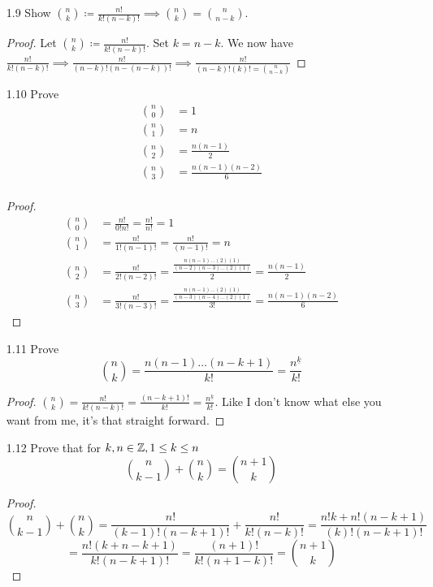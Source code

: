 \documentclass[12pt]{article}
\begin{document}
\begin{itemize}
		\item [1.9] Show $\binom{n}{k} \coloneq \frac{n!}{k!(n-k)!} \implies \binom{n}{k} = \binom{n}{n-k}$.
		\begin{proof}
			Let $\binom{n}{k} \coloneq \frac{n!}{k!(n-k)!}$. Set $k=n-k$. We now have $\frac{n!}{k!(n-k)!} \implies \frac{n!}{(n-k)!(n-(n-k))!} \implies \frac{n!}{(n-k)!(k)! = \binom{n}{n-k}}$
		\end{proof}
		\item [1.10] Prove 
			\begin{align*}
				\binom{n}{0} &= 1\\
				\binom{n}{1} &= n\\
				\binom{n}{2} &= \frac{n(n-1)}{2}\\
				\binom{n}{3} &= \frac{n(n-1)(n-2)}{6}\\
			\end{align*}
			\begin{proof}
				\begin{align*}
					\binom{n}{0} &= \frac{n!}{0!n!} = \frac{n!}{n!} = 1\\
					\binom{n}{1} &= \frac{n!}{1!(n-1)!} = \frac{n!}{(n-1)!} = n\\
					\binom{n}{2} &= \frac{n!}{2!(n-2)!} = \frac{\frac{n(n-1)\ldots(2)(1)}{(n-2)(n-3)\ldots(2)(1)}}{2} = \frac{n(n-1)}{2}\\
					\binom{n}{3} &= \frac{n!}{3!(n-3)!} = \frac{\frac{n(n-1)\ldots(2)(1)}{(n-3)(n-4)\ldots(2)(1)}}{3!} = \frac{n(n-1)(n-2)}{6}
				\end{align*}
			\end{proof}
		\item [1.11] Prove $$\binom{n}{k} = \frac{n(n-1)\ldots(n-k+1)}{k!} = \frac{n^{\underline{k}}}{k!}$$
		\begin{proof}
			$\binom{n}{k} = \frac{n!}{k!(n-k)!} = \frac{(n-k+1)!}{k!} = \frac{n^{\underline{k}}}{k!}$. Like I don't know what else you want from me, it's that straight forward.
		\end{proof}
	
		\item [1.12] Prove that for $k,n\in \mathbb{Z}, 1\leq k \leq n$ $$\binom{n}{k-1} + \binom{n}{k} = \binom{n+1}{k}$$
		\begin{proof}
			\[\binom{n}{k-1} + \binom{n}{k} = \frac{n!}{(k-1)!(n-k+1)!} + \frac{n!}{k!(n-k)!} = \frac{n!k + n!(n-k+1)}{(k)!(n-k+1)!}\] 
			\[= \frac{n!(k+n-k+1)}{k!(n-k+1)!} = \frac{(n+1)!}{k!(n+1-k)!} = \binom{n+1}{k}\]
		\end{proof}
		

\end{itemize}
\end{document}
